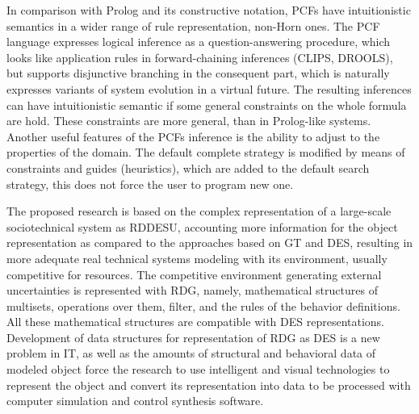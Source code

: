 \documentclass[conference]{IEEEtran}
\begin{document}
In comparison with Prolog and its constructive notation, PCFs have intuitionistic semantics in a wider range of rule representation, non-Horn ones. The PCF language expresses logical inference as a question-answering procedure, which looks like application rules in forward-chaining inferences (CLIPS, DROOLS), but supports disjunctive branching in the consequent part, which is naturally expresses variants of system evolution in a virtual future. The resulting inferences can have intuitionistic semantic if some general constraints on the whole formula are hold. These constraints are more general, than in Prolog-like systems. Another useful features of the PCFs inference is the ability to adjust to the properties of the domain. The default complete strategy is modified by means of constraints and guides (heuristics), which are added to the default search strategy, this does not force the user to program new one.



The proposed research is based on the complex representation of a large-scale sociotechnical system as RDDESU, accounting more information for the object representation as compared to the approaches based on GT and DES, resulting in more adequate real technical systems modeling with its environment, usually competitive for resources. The competitive environment generating external uncertainties is represented with RDG, namely, mathematical structures of multisets, operations over them, filter, and the rules of the behavior definitions.  All these mathematical structures are compatible with DES representations.  Development of data structures for representation of RDG as DES is a new problem in IT, as well as the amounts of structural and behavioral data of modeled object force the research to use intelligent and visual technologies to represent the object and convert its representation into data to be processed with computer simulation and control synthesis software.


\end{document}
